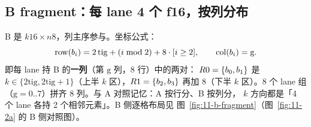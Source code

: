 \subsection{B fragment：每 lane 4 个 f16，按列分布}

B 是 $k16 \times n8$，列主序参与。坐标公式：
\begin{equation}
  \mathrm{row}(b\sb i) = 2\,\mathrm{tig} + (i \bmod 2) + 8\cdot[i \ge 2],
  \qquad \mathrm{col}(b\sb i) = \mathrm{g}.
  \label{eq:11-bpos}
\end{equation}
即每 lane 持 B 的\textbf{一列}（第 $\mathrm{g}$ 列，8 行）中的两对：
$R0 = \{b\sb 0,b\sb 1\}$ 是 $k \in \{2\mathrm{tig}, 2\mathrm{tig}{+}1\}$（上半
$k$ 区），$R1 = \{b\sb 2,b\sb 3\}$ 再加 8（下半 $k$ 区）。8 个 lane 组
（$\mathrm{g} = 0..7$）拼齐 8 列。与 A 对照记忆：A 按行分、B 按列分，
$k$ 方向都是「4 个 lane 各持 2 个相邻元素」。B 侧逐格布局见
图~\ref{fig:11-b-fragment}（图~\ref{fig:11-2a} 的 B 侧对照图）。

